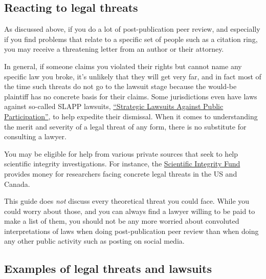 \documentclass[letterpaper, 12pt]{article}
\begin{document}
\subsection*{Reacting to legal threats}

As discussed above, if you do a lot of post-publication peer review, and especially if you find problems that relate to a specific set of people such as a citation ring, you may receive a threatening letter from an author or their attorney.

In general, if someone claims you violated their rights but cannot name any specific law you broke, it's unlikely that they will get very far, and in fact most of the time such threats do not go to the lawsuit stage because the would-be plaintiff has no concrete basis for their claims. Some jurisdictions even have laws against so-called SLAPP lawsuits, \href{https://en.wikipedia.org/wiki/Strategic_lawsuit_against_public_participation}{``Strategic Lawsuits Against Public Participation''}, to help expedite their dismissal. When it comes to understanding the merit and severity of a legal threat of any form, there is no substitute for consulting a lawyer.

You may be eligible for help from various private sources that seek to help scientific integrity investigations.
For instance, the \href{https://scientificintegrityfund.org/}{Scientific Integrity Fund} provides money for researchers facing concrete legal threats in the US and Canada.

This guide does \emph{not} discuss every theoretical threat you could face. While you could worry about those, and you can always find a lawyer willing to be paid to make a list of them, you should not be any more worried about convoluted interpretations of laws when doing post-publication peer review than when doing any other public activity such as posting on social media.


\subsection*{Examples of legal threats and lawsuits}
\end{document}
